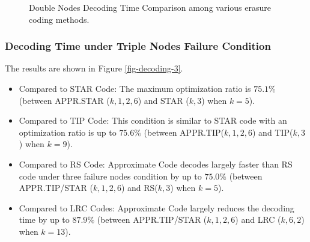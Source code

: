 \documentclass[sigconf]{acmart}
\begin{document}

\begin{figure}[ht]
    \vspace{-0.3cm}
    \caption{Double Nodes Decoding Time Comparison among various erasure coding methods.}\label{fig-decoding-2}
    \end{figure}

\subsubsection{Decoding Time under Triple Nodes Failure Condition}
The results are shown in Figure \ref{fig-decoding-3}.
\begin{itemize}
    \item Compared to STAR Code: The maximum optimization ratio is $75.1\%$ (between APPR.STAR ($k,1,2,6$) and STAR ($k,3$) when $k = 5$).
    \item Compared to TIP Code: This condition is similar to STAR code with an optimization ratio is up to $75.6\%$ (between APPR.TIP($k,1,2,6$) and TIP($k,3$) when $k = 9$).
    \item Compared to RS Code: Approximate Code decodes largely faster than RS code under three failure nodes condition by up to $75.0\%$ (between APPR.TIP/STAR ($k,1,2,6$) and RS($k,3$) when $k = 5$).
    \item Compared to LRC Codes: Approximate Code largely reduces the decoding time  by up to $87.9\%$  (between APPR.TIP/STAR ($k,1,2,6$) and LRC ($k, 6, 2$) when $k = 13$).
\end{itemize}
\end{document}
